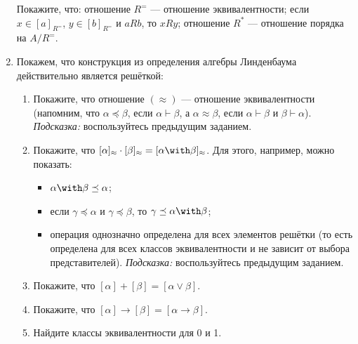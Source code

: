 \begin{enumerate}
            Покажите, что: отношение $R^=$ --- отношение эквивалентности; если $x \in [a]_{R^=}$, $y \in [b]_{R^=}$ и $aRb$, то $xRy$; отношение $R^*$ ---
            отношение порядка на $A/{R^=}$.

      \item Покажем, что конструкция из определения алгебры Линденбаума действительно является решёткой:
            \begin{enumerate}
                  \item Покажите, что отношение $(\approx)$ --- отношение эквивалентности (напомним, что $\alpha\preceq\beta$, если $\alpha\vdash\beta$, а $\alpha\approx\beta$, если
                        $\alpha\vdash\beta$ и $\beta\vdash\alpha$). \emph{Подсказка:} воспользуйтесь предыдущим заданием.
                  \item Покажите, что $[\alpha]_\approx\cdot[\beta]_\approx = [\alpha\with\beta]_\approx$. Для этого, например, можно показать:
                        \begin{itemize}
                              \item $\alpha\with\beta \preceq \alpha$;
                              \item если $\gamma \preceq \alpha$ и $\gamma\preceq\beta$, то $\gamma\preceq\alpha\with\beta$;
                              \item операция однозначно определена для всех элементов решётки (то есть определена для всех классов
                                    эквивалентности и не зависит от выбора представителей). \emph{Подсказка:} воспользуйтесь предыдущим заданием.
                        \end{itemize}
                  \item Покажите, что $[\alpha]+[\beta]=[\alpha\vee\beta]$.
                  \item Покажите, что $[\alpha]\rightarrow[\beta]=[\alpha\rightarrow\beta]$.
                  \item Найдите классы эквивалентности для 0 и 1.
            \end{enumerate}
\end{enumerate}

